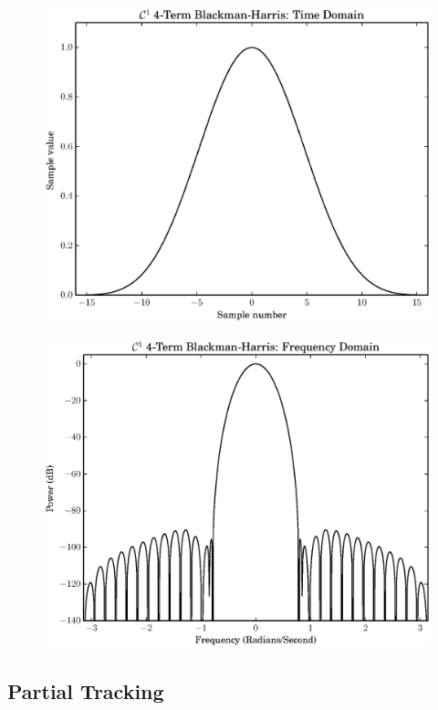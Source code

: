 \documentclass[letterpaper,12pt]{report}
\begin{document}
\begin{figure}
    \caption{}
    \includegraphics[width=\textwidth]{plots/c1_blackman_td.eps}
\end{figure}

\begin{figure}
    \caption{}
    \includegraphics[width=\textwidth]{plots/c1_blackman_fd.eps}
\end{figure}

\subsection{\label{sec:partialtracking}Partial Tracking}
\end{document}
